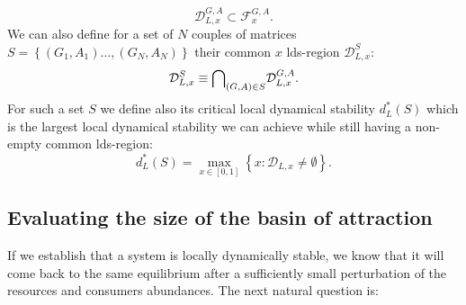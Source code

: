\documentclass[12pt, titlepage]{report}
\begin{document}
\begin{equation}
\mathcal{D}_{L,x}^{G,A} \subset \mathcal{F}_x^{G,A}.
\end{equation}
We can also define for a set of $N$ couples of matrices $S=\left\{(G_1, A_1) \dots, (G_N, A_N)\right\}$ their common $x$ lds-region $\mathcal{D}_{L,x}^S$:
\begin{equation}
\mathcal{D}_{L,x}^S \equiv {\bigcap}_{(G,A) \in S} \mathcal{D}_{L,x}^{G,A}.
\end{equation}
For such a set $S$ we define also its critical local dynamical stability $d_L^*(S)$ which is the largest local dynamical stability we can achieve while still having a non-empty common lds-region:
\begin{equation}
d_L^*(S) = \max_{x \in [0,1]}\left\{x: \mathcal{D}_{L,x} \neq \emptyset \right\}.
\end{equation}


\subsection{Evaluating the size of the basin of attraction}
If we establish that a system is locally dynamically stable, we know that it will come back to the same equilibrium after a sufficiently small perturbation of the resources and consumers abundances. The next natural question is:


\begin{centering}
\end{centering}
\end{document}
